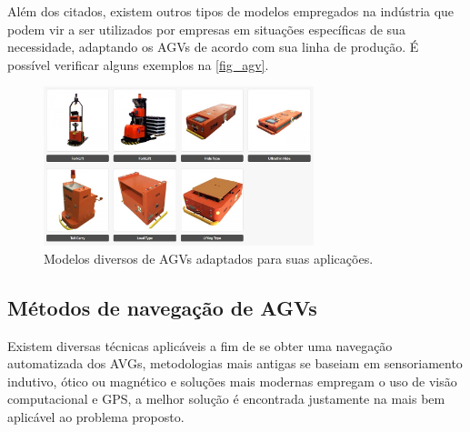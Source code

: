 Além dos citados, existem outros tipos de modelos empregados na indústria que
podem vir a ser utilizados por empresas em situações específicas de sua
necessidade, adaptando os AGVs de acordo com sua linha de produção. É possível
verificar alguns exemplos na \autoref{fig_agv}.

\begin{figure}[htb]
        \centering
        \caption{\label{fig_agv}Modelos diversos de AGVs adaptados para suas aplica{\c c}{\~o}es.}
        \includegraphics[width=0.7\textwidth]{images/suzhou-agv-robot-products.jpg}
\end{figure}


\subsection{M{\'e}todos de navega{\c c}{\~a}o de AGVs}

Existem diversas técnicas aplicáveis a fim de se obter uma navegação
automatizada dos AVGs, metodologias mais antigas se baseiam em sensoriamento
indutivo, ótico ou magnético e soluções mais modernas empregam o uso de visão
computacional e GPS, a melhor solução é encontrada justamente na mais bem
aplicável ao problema proposto.

